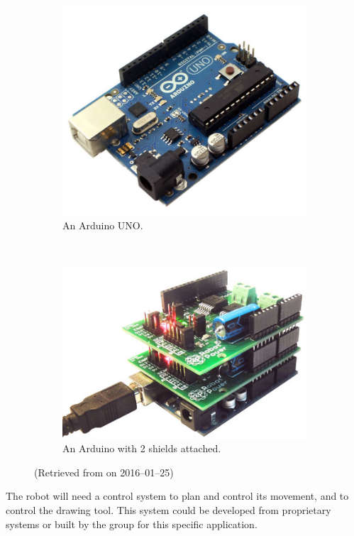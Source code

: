     \begin{figure}%
        \centering
        \begin{subfigure}[b]{0.45\textwidth}
            \includegraphics[width=\textwidth]{Files/arduino}
            \caption{An Arduino UNO.}
            \label{fig: arduino}
        \end{subfigure}
        ~
        \begin{subfigure}[b]{0.45\textwidth}
            \includegraphics[width=\textwidth]{Files/arduino_with_shields}
            \caption{An Arduino with 2 \glspl{shield} attached.}
            \label{fig: arduino shields}
        \end{subfigure}
        \caption{\small (Retrieved from  on 2016--01--25)}
        \label{fig: arduino and shields}
    \end{figure}
    The robot will need a control system to plan and control its movement, and to control the drawing tool. This system could be developed from proprietary systems or built by the group for this specific application.

